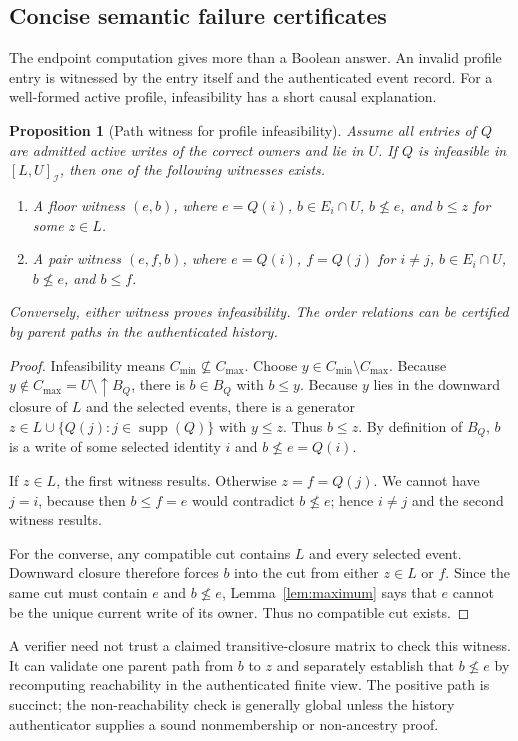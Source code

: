 \documentclass[11pt]{article}
\newtheorem{proposition}[theorem]{Proposition}
\theoremstyle{definition}
\newcommand{\Id}{\mathcal I}
\newcommand{\supp}{\operatorname{supp}}
\newcommand{\lo}{C_{\min}}
\newcommand{\hi}{C_{\max}}
\begin{document}
\subsection{Concise semantic failure certificates}
The endpoint computation gives more than a Boolean answer.  An invalid profile entry is witnessed by the entry itself and the authenticated event record.  For a well-formed active profile, infeasibility has a short causal explanation.

\begin{proposition}[Path witness for profile infeasibility]\label{prop:path-witness}
Assume all entries of $Q$ are admitted active writes of the correct owners and lie in $U$.  If $Q$ is infeasible in $[L,U]_{\Id}$, then one of the following witnesses exists.
\begin{enumerate}
  \item A \emph{floor witness} $(e,b)$, where $e=Q(i)$, $b\in E_i\cap U$, $b\not\leq e$, and $b\leq z$ for some $z\in L$.
  \item A \emph{pair witness} $(e,f,b)$, where $e=Q(i)$, $f=Q(j)$ for $i\neq j$, $b\in E_i\cap U$, $b\not\leq e$, and $b\leq f$.
\end{enumerate}
Conversely, either witness proves infeasibility.  The order relations can be certified by parent paths in the authenticated history.
\end{proposition}
\begin{proof}
Infeasibility means $\lo\nsubseteq\hi$.  Choose $y\in\lo\setminus\hi$.  Because $y\notin\hi=U\setminus\uparrow B_Q$, there is $b\in B_Q$ with $b\leq y$.  Because $y$ lies in the downward closure of $L$ and the selected events, there is a generator $z\in L\cup\{Q(j):j\in\supp(Q)\}$ with $y\leq z$.  Thus $b\leq z$.  By definition of $B_Q$, $b$ is a write of some selected identity $i$ and $b\not\leq e=Q(i)$.

If $z\in L$, the first witness results.  Otherwise $z=f=Q(j)$.  We cannot have $j=i$, because then $b\leq f=e$ would contradict $b\not\leq e$; hence $i\neq j$ and the second witness results.

For the converse, any compatible cut contains $L$ and every selected event.  Downward closure therefore forces $b$ into the cut from either $z\in L$ or $f$.  Since the same cut must contain $e$ and $b\not\leq e$, Lemma~\ref{lem:maximum} says that $e$ cannot be the unique current write of its owner.  Thus no compatible cut exists.
\end{proof}

A verifier need not trust a claimed transitive-closure matrix to check this witness.  It can validate one parent path from $b$ to $z$ and separately establish that $b\not\leq e$ by recomputing reachability in the authenticated finite view.  The positive path is succinct; the non-reachability check is generally global unless the history authenticator supplies a sound nonmembership or non-ancestry proof.
\end{document}
